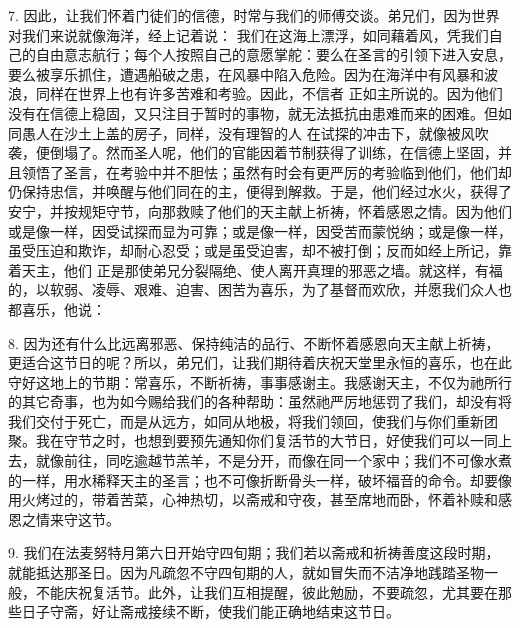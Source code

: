 7. 因此，让我们怀着门徒们的信德，时常与我们的师傅交谈。弟兄们，因为世界对我们来说就像海洋，经上记着说： 我们在这海上漂浮，如同藉着风，凭我们自己的自由意志航行；每个人按照自己的意愿掌舵：要么在圣言的引领下进入安息，要么被享乐抓住，遭遇船破之患，在风暴中陷入危险。因为在海洋中有风暴和波浪，同样在世界上也有许多苦难和考验。因此，不信者 正如主所说的。因为他们没有在信德上稳固，又只注目于暂时的事物，就无法抵抗由患难而来的困难。但如同愚人在沙土上盖的房子，同样，没有理智的人 在试探的冲击下，就像被风吹袭，便倒塌了。然而圣人呢，他们的官能因着节制获得了训练，在信德上坚固，并且领悟了圣言，在考验中并不胆怯；虽然有时会有更严厉的考验临到他们，他们却仍保持忠信，并唤醒与他们同在的主，便得到解救。于是，他们经过水火，获得了安宁，并按规矩守节，向那救赎了他们的天主献上祈祷，怀着感恩之情。因为他们或是像一样，因受试探而显为可靠；或是像一样，因受苦而蒙悦纳；或是像一样，虽受压迫和欺诈，却耐心忍受；或是虽受迫害，却不被打倒；反而如经上所记，靠着天主，他们 正是那使弟兄分裂隔绝、使人离开真理的邪恶之墙。就这样，有福的，以软弱、凌辱、艰难、迫害、困苦为喜乐，为了基督而欢欣，并愿我们众人也都喜乐，他说：\par

8. 因为还有什么比远离邪恶、保持纯洁的品行、不断怀着感恩向天主献上祈祷，更适合这节日的呢？所以，弟兄们，让我们期待着庆祝天堂里永恒的喜乐，也在此守好这地上的节期：常喜乐，不断祈祷，事事感谢主。我感谢天主，不仅为祂所行的其它奇事，也为如今赐给我们的各种帮助：虽然祂严厉地惩罚了我们，却没有将我们交付于死亡，而是从远方，如同从地极，将我们领回，使我们与你们重新团聚。我在守节之时，也想到要预先通知你们复活节的大节日，好使我们可以一同上去，就像前往，同吃逾越节羔羊，不是分开，而像在同一个家中；我们不可像水煮的一样，用水稀释天主的圣言；也不可像折断骨头一样，破坏福音的命令。却要像用火烤过的，带着苦菜，心神热切，以斋戒和守夜，甚至席地而卧，怀着补赎和感恩之情来守这节。\par

9. 我们在法麦努特月第六日开始守四旬期；我们若以斋戒和祈祷善度这段时期，就能抵达那圣日。因为凡疏忽不守四旬期的人，就如冒失而不洁净地践踏圣物一般，不能庆祝复活节。此外，让我们互相提醒，彼此勉励，不要疏忽，尤其要在那些日子守斋，好让斋戒接续不断，使我们能正确地结束这节日。\par

